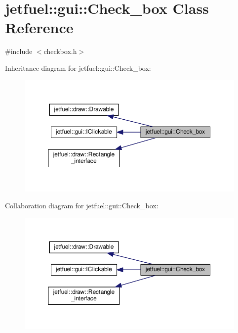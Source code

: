 \hypertarget{classjetfuel_1_1gui_1_1Check__box}{}\section{jetfuel\+:\+:gui\+:\+:Check\+\_\+box Class Reference}
\label{classjetfuel_1_1gui_1_1Check__box}


{\ttfamily \#include $<$checkbox.\+h$>$}



Inheritance diagram for jetfuel\+:\+:gui\+:\+:Check\+\_\+box\+:
\nopagebreak
\begin{figure}[H]
\begin{center}
\leavevmode
\includegraphics[width=350pt]{classjetfuel_1_1gui_1_1Check__box__inherit__graph}
\end{center}
\end{figure}


Collaboration diagram for jetfuel\+:\+:gui\+:\+:Check\+\_\+box\+:
\nopagebreak
\begin{figure}[H]
\begin{center}
\leavevmode
\includegraphics[width=350pt]{classjetfuel_1_1gui_1_1Check__box__coll__graph}
\end{center}
\end{figure}
